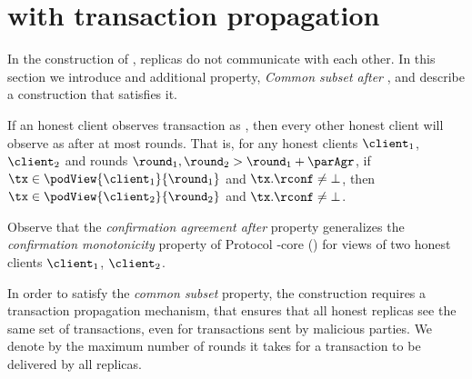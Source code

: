 \section{\podtm with transaction propagation} \label{sec:pod-with-propagation}
In the construction of , replicas do not communicate with each other.
In this section we introduce and additional property, \emph{Common subset after \parAgr}, and describe a construction that satisfies it.


\begin{definition}
    If an honest client observes transaction \tx as \confirmed,
    then every other honest client will observe \tx as \confirmed after at most \parAgr rounds.
    That is, for any honest clients $\client_1$, $\client_2$ and rounds $\round_1, \round_2 > \round_1 + \parAgr$,
    if $\tx \in \podView{\client_1}{\round_1}$ and $\tx.\rconf \neq \bot$, then $\tx \in \podView{\client_2}{\round_2}$ and $\tx.\rconf \neq \bot$.
\end{definition}
Observe that the \emph{confirmation agreement after \parAgr} property generalizes the \emph{confirmation monotonicity} property of Protocol \podtm-core () for views of two honest clients $\client_1$, $\client_2$.

    

\begin{construction}\label{cons:pod-with-prop}
    In order to satisfy the \emph{common subset} property,
    the construction requires a transaction propagation mechanism, that ensures that all honest replicas see the same set of transactions,
    even for transactions sent by malicious parties.
    We denote by \tProp the maximum number of rounds it takes for a transaction to be delivered by all replicas.
\end{construction}

